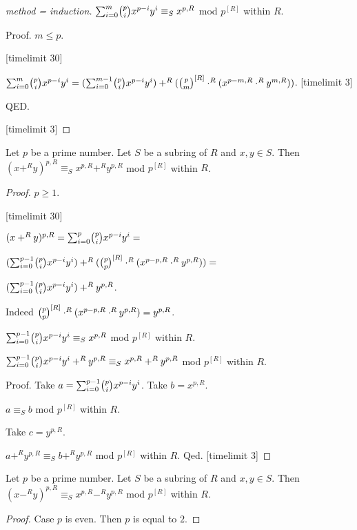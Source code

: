 \documentclass[11pt]{article}
\begin{document}
\begin{forthel}
\begin{proof}[method = induction]
$\binsum{m}{p}{x}{y}{R}  
\equiv_{S} x^{p,R} $ mod $p^{[R]}$ within $R$.

Proof. $m \leq p$. 

[timelimit 30]

$\binsum{m}{p}{x}{y}{R} = 
(\binsum{m-1}{p}{x}{y}{R}) +^{R} (\cho{p}{m}^{[R]} \cdot^{R} (x^{p - m,R} \cdot^{R} y^{m,R}))$.
[timelimit 3]

QED.

[timelimit 3]

\end{proof}

\begin{lemma} Let $p$ be a prime number.
Let $S$ be a subring of $R$ and $x,y \in S$. 
Then $(x +^{R} y)^{p,R} \equiv_{S} x^{p,R} +^{R} y^{p,R}$ mod $p^{[R]}$ within $R$.
\end{lemma}

\begin{proof} $p \geq 1$.

[timelimit 30]

$(x +^{R} y)^{p,R} =  \binsum{p}{p}{x}{y}{R} =$

$ (\binsum{p-1}{p}{x}{y}{R}) +^{R} (\cho{p}{p}^{[R]} \cdot^{R} (x^{p - p,R} \cdot^{R} y^{p,R})) =$

$ (\binsum{p-1}{p}{x}{y}{R}) +^{R} y^{p,R}$.

Indeed $\cho{p}{p}^{[R]} \cdot^{R} (x^{p - p,R} \cdot^{R} y^{p,R}) = y^{p,R}$.

$ \binsum{p-1}{p}{x}{y}{R} \equiv_{S} x^{p,R}$ mod $p^{[R]}$ within $R$.

$ \binsum{p-1}{p}{x}{y}{R} +^{R} y^{p,R} \equiv_{S} x^{p,R} +^{R} y^{p,R}$ mod $p^{[R]}$ within $R$.

Proof.
Take $a = \binsum{p-1}{p}{x}{y}{R}$.
Take $b = x^{p,R}$. 

$a \equiv_{S} b $ mod $p^{[R]}$ within $R$.

Take $c = y^{p,R}$.

$a +^{R} y^{p,R} \equiv_{S} b +^{R} y^{p,R} $ mod $p^{[R]}$ within $R$.
Qed.
[timelimit 3]
\end{proof}

\begin{lemma} Let $p$ be a prime number.
Let $S$ be a subring of $R$ and $x,y \in S$. 
Then $(x -^{R} y)^{p,R} \equiv_{S} x^{p,R} -^{R} y^{p,R}$ mod $p^{[R]}$ within $R$.
\end{lemma}
\begin{proof}

Case $p$ is even. Then $p$ is equal to $2$.


\end{proof}
\end{forthel}
\end{document}
